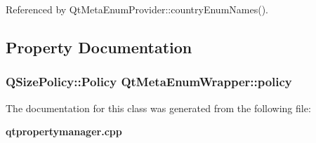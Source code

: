 Referenced by Qt\+Meta\+Enum\+Provider\+::country\+Enum\+Names().



\subsection{Property Documentation}
\subsubsection[{policy}]{\setlength{\rightskip}{0pt plus 5cm}Q\+Size\+Policy\+::\+Policy Qt\+Meta\+Enum\+Wrapper\+::policy\hspace{0.3cm}{\ttfamily [read]}}\label{classQtMetaEnumWrapper_af53b3bdcdae6f9689087ffc3bfcae5c7}


The documentation for this class was generated from the following file\+:\begin{DoxyCompactItemize}
\item 
{\bf qtpropertymanager.\+cpp}\end{DoxyCompactItemize}
